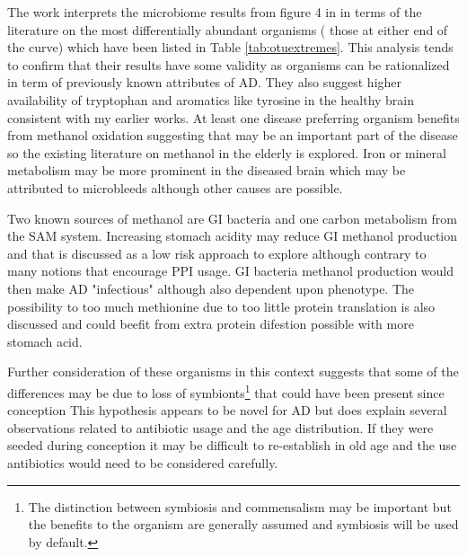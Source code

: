 \documentclass[aps,secnumarabic,balancelastpage,amsmath,amssymb,nofootinbib]{revtex4}
\newcommand{\mjmreftab}[1]{Table  \ref{tab:#1}}
\begin{document}
The work interprets the microbiome results
from figure 4 in \cite{10.3389/fcimb.2023.1123228} 
in terms of the literature on the most differentially abundant
organisms ( those at either end of the curve)
which have been listed in \mjmreftab{otuextremes}.
This analysis tends to confirm that their results have some validity
as organisms can be rationalized in term of previously
known attributes of AD. 
They also suggest higher availability of tryptophan and
aromatics like tyrosine in the healthy brain consistent 
with my earlier works.
At least one disease preferring organism benefits from
methanol oxidation suggesting that may be an important
part of the disease so the existing literature on
methanol in the elderly is explored. 
Iron or mineral metabolism may be more prominent in 
the diseased brain which may be attributed to microbleeds
although other causes are possible.

Two known sources of methanol are GI bacteria and 
one carbon metabolism from the SAM system. 
Increasing stomach acidity may reduce GI methanol
production and that is discussed as a low
risk approach to explore although contrary to
many notions that encourage PPI usage. 
GI bacteria methanol production would then make AD "infectious" although 
also dependent upon phenotype.
The possibility to too much methionine due to too little
protein translation is also discussed and could beefit
from extra protein difestion possible with more stomach acid. 

Further consideration  of these organisms in this  
context suggests that some of the differences may be due to loss of
symbionts\footnote{ The distinction between symbiosis and commensalism may be important but the benefits to the organism are generally assumed and symbiosis will be used by default. } 
 that could have been present since conception
This hypothesis appears to be novel for AD but does
explain several observations related to antibiotic usage
and the age distribution. 
If they were seeded during conception it may be difficult
to re-establish in old age and the use antibiotics would
need to be considered carefully. 


\end{document}
